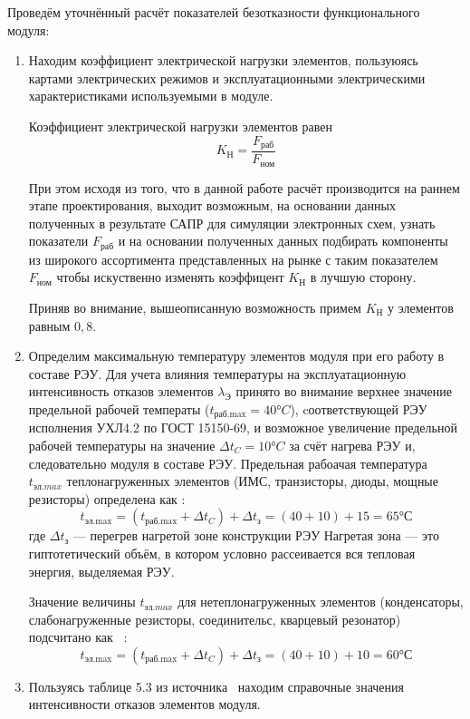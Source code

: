 Проведём уточнённый расчёт показателей безотказности функционального модуля:
\begin{enumerate}
\item Находим коэффициент электрической нагрузки элементов, пользуюясь
картами электрических режимов и эксплуатационными электрическими
характеристиками используемыми в модуле.

Коэффициент электрической нагрузки элементов равен
\begin{equation}
  K_{\text{Н}} = \frac{F_{\text{раб}}}{F_{\text{ном}}}
\end{equation}

При этом исходя из того, что в данной работе расчёт производится на
раннем этапе проектирования, выходит возможным, на
основании данных полученных в результате САПР для симуляции
электронных схем, узнать показатели $F_{\text{раб}}$ и
на основании полученных данных подбирать компоненты из широкого
ассортимента представленных на рынке с таким показателем
$F_{\text{ном}}$ чтобы искуственно изменять коэффицент
$K_{\text{Н}}$ в лучшую сторону. 

Приняв во внимание,  вышеописанную возможность примем
$K_{\text{Н}}$ у элементов равным $0,8$.


\item Определим максимальную температуру элементов модуля при его
работу в составе РЭУ.  Для учета влияния температуры на
эксплуатационную интенсивность отказов элементов $\lambda_{\text{Э}}$
принято во внимание верхнее значение предельной рабочей температы
($t_{\text{раб.max}}= 40°C$), cоответствующей РЭУ исполнения УХЛ4.2 по
ГОСТ 15150-69, и возможное увеличение предельной рабочей температуры
на значение $\Delta t_C = 10°C$ за счёт нагрева РЭУ и, следовательно
модуля в составе РЭУ.  Предельная рабоачая температура $t_{эл.max}$
теплонагруженных элементов (ИМС, транзисторы, диоды, мощные резисторы)
определена как \cite{Borovikov2010}:
  \begin{equation}
    t_{\text{эл.max}} = (t_{\text{раб.max}} + \Delta t_C) + \Delta t_{\text{з}} = (40 + 10) +15 = 65°С
  \end{equation}
  где $\Delta t_{\text{з}}$ — перегрев нагретой зоне конструкции РЭУ
Нагретая зона — это гиптотетический объём, в котором условно
рассеивается вся тепловая энергия, выделяемая РЭУ.

  Значение величины $t_{эл.max}$ для нетеплонагруженных элементов
(конденсаторы, слабонагруженные резисторы, соединительс, кварцевый
резонатор) подсчитано как ~\cite{Borovikov2010}:
  \begin{equation}
    t_{\text{эл.max}} = (t_{\text{раб.max}} + \Delta t_C) + \Delta t_{\text{з}} = (40 + 10) +10 = 60°С
  \end{equation}
\item Пользуясь таблице 5.3 из источника~\cite{Borovikov2010} находим
  справочные значения интенсивности отказов элементов модуля.


\end{enumerate}
